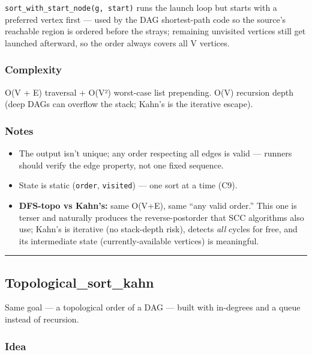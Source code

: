 \documentclass[
  10pt,
  letterpaper,
  onecolumn]{article}
\providecommand{\tightlist}{%
  \setlength{\itemsep}{0pt}\setlength{\parskip}{0pt}}
\begin{document}
\texttt{sort\_with\_start\_node(g,\ start)} runs the launch loop but
starts with a preferred vertex first --- used by the DAG shortest-path
code so the source's reachable region is ordered before the strays;
remaining unvisited vertices still get launched afterward, so the order
always covers all V vertices.

\hypertarget{complexity-14}{%
\subsubsection{Complexity}\label{complexity-14}}

O(V + E) traversal + O(V²) worst-case list prepending. O(V) recursion
depth (deep DAGs can overflow the stack; Kahn's is the iterative
escape).

\hypertarget{notes-13}{%
\subsubsection{Notes}\label{notes-13}}

\begin{itemize}
\tightlist
\item
  The output isn't unique; any order respecting all edges is valid ---
  runners should verify the edge property, not one fixed sequence.
\item
  State is static (\texttt{order}, \texttt{visited}) --- one sort at a
  time (C9).
\item
  \textbf{DFS-topo vs Kahn's:} same O(V+E), same ``any valid order.''
  This one is terser and naturally produces the reverse-postorder that
  SCC algorithms also use; Kahn's is iterative (no stack-depth risk),
  detects \emph{all} cycles for free, and its intermediate state
  (currently-available vertices) is meaningful.
\end{itemize}

\begin{center}\rule{0.5\linewidth}{0.5pt}\end{center}

\hypertarget{topological_sort_kahn}{%
\subsection{Topological\_sort\_kahn}\label{topological_sort_kahn}}

Same goal --- a topological order of a DAG --- built with in-degrees and
a queue instead of recursion.

\hypertarget{idea-15}{%
\subsubsection{Idea}\label{idea-15}}
\end{document}
